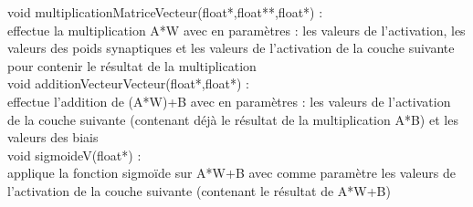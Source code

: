 \documentclass{article}
\begin{document}
			void multiplicationMatriceVecteur(float*,float**,float*) :\\
				effectue la multiplication A*W avec en paramètres : les valeurs de l'activation, les valeurs des poids synaptiques et les valeurs de l'activation de la couche suivante pour contenir le résultat de la multiplication\\
				
			void additionVecteurVecteur(float*,float*) :\\
				effectue l'addition de (A*W)+B avec en paramètres : les valeurs de l'activation de la couche suivante (contenant déjà le résultat de la multiplication A*B) et les valeurs des biais\\
				
			void sigmoideV(float*) :\\
				applique la fonction sigmoïde sur A*W+B avec comme paramètre les valeurs de l'activation de la couche suivante (contenant le résultat de  A*W+B)\\
\end{document}
